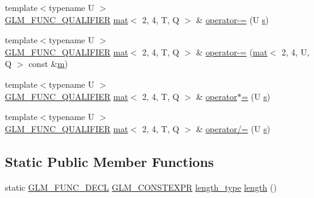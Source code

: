 \begin{DoxyCompactItemize}
{\footnotesize template$<$typename U $>$ }\\\hyperlink{setup_8hpp_a33fdea6f91c5f834105f7415e2a64407}{G\+L\+M\+\_\+\+F\+U\+N\+C\+\_\+\+Q\+U\+A\+L\+I\+F\+I\+ER} \hyperlink{structglm_1_1mat}{mat}$<$ 2, 4, T, Q $>$ \& \hyperlink{structglm_1_1mat_3_012_00_014_00_01_t_00_01_q_01_4_a341e3a7ac4ef80473285d574b8e86849}{operator-\/=} (U \hyperlink{_s_d_l__opengl_8h_a4af680a6c683f88ed67b76f207f2e6e4}{s})
\item 
{\footnotesize template$<$typename U $>$ }\\\hyperlink{setup_8hpp_a33fdea6f91c5f834105f7415e2a64407}{G\+L\+M\+\_\+\+F\+U\+N\+C\+\_\+\+Q\+U\+A\+L\+I\+F\+I\+ER} \hyperlink{structglm_1_1mat}{mat}$<$ 2, 4, T, Q $>$ \& \hyperlink{structglm_1_1mat_3_012_00_014_00_01_t_00_01_q_01_4_adf8786e77c3b21c8436cd0b7aa921803}{operator-\/=} (\hyperlink{structglm_1_1mat}{mat}$<$ 2, 4, U, Q $>$ const \&\hyperlink{_s_d_l__opengl__glext_8h_af593500c283bf1a787a6f947f503a5c2}{m})
\item 
{\footnotesize template$<$typename U $>$ }\\\hyperlink{setup_8hpp_a33fdea6f91c5f834105f7415e2a64407}{G\+L\+M\+\_\+\+F\+U\+N\+C\+\_\+\+Q\+U\+A\+L\+I\+F\+I\+ER} \hyperlink{structglm_1_1mat}{mat}$<$ 2, 4, T, Q $>$ \& \hyperlink{structglm_1_1mat_3_012_00_014_00_01_t_00_01_q_01_4_ac24896ac1bbba0ec89256b63209e4593}{operator$\ast$=} (U \hyperlink{_s_d_l__opengl_8h_a4af680a6c683f88ed67b76f207f2e6e4}{s})
\item 
{\footnotesize template$<$typename U $>$ }\\\hyperlink{setup_8hpp_a33fdea6f91c5f834105f7415e2a64407}{G\+L\+M\+\_\+\+F\+U\+N\+C\+\_\+\+Q\+U\+A\+L\+I\+F\+I\+ER} \hyperlink{structglm_1_1mat}{mat}$<$ 2, 4, T, Q $>$ \& \hyperlink{structglm_1_1mat_3_012_00_014_00_01_t_00_01_q_01_4_af8635abf4f1d5f627b0d346d2c850911}{operator/=} (U \hyperlink{_s_d_l__opengl_8h_a4af680a6c683f88ed67b76f207f2e6e4}{s})
\end{DoxyCompactItemize}
\subsection*{Static Public Member Functions}
\begin{DoxyCompactItemize}
\item 
static \hyperlink{setup_8hpp_ab2d052de21a70539923e9bcbf6e83a51}{G\+L\+M\+\_\+\+F\+U\+N\+C\+\_\+\+D\+E\+CL} \hyperlink{setup_8hpp_a08b807947b47031d3a511f03f89645ad}{G\+L\+M\+\_\+\+C\+O\+N\+S\+T\+E\+X\+PR} \hyperlink{structglm_1_1mat_3_012_00_014_00_01_t_00_01_q_01_4_a5295c484627e965d615f3367c2ca45d8}{length\+\_\+type} \hyperlink{structglm_1_1mat_3_012_00_014_00_01_t_00_01_q_01_4_a52f7dc5b855a6dab6b479a3bcf29357b}{length} ()
\end{DoxyCompactItemize}
